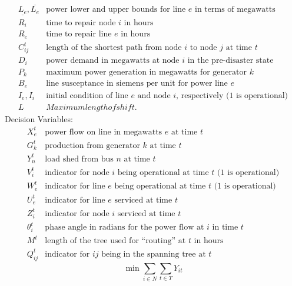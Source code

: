 \documentclass{article}
\begin{document}
	\begin{displaymath}
	\begin{array}{ll}
	\underline{L_e},\overline{L_e} & \mbox{power lower and upper bounds for line $e$ in terms of megawatts}\\
	R_{i} & \mbox{time to repair node $i$ in hours} \\
	R_{e} & \mbox{time to repair line $e$ in hours}\\
	C_{ij}^t & \mbox{length of the shortest path from node $i$ to node $j$ at time $t$}\\
	D_i & \mbox{power demand in megawatts at node $i$ in the pre-disaster state}\\
	P_k & \mbox{maximum power generation in megawatts for generator $k$}\\
	B_e&  \mbox{line susceptance in siemens per unit for power line $e$}\\
	I_e, I_i & \mbox{initial condition of line $e$ and node $i$, respectively (1 is operational)}\\
	L & Maximum length of shift.
		\end{array}
	\end{displaymath}
	Decision Variables:
	\begin{displaymath}
	\begin{array}{ll}
	X_{e}^{t} & \mbox{power flow on line in megawatts $e$ at time $t$}\\
	G_{k}^t & \mbox{production from generator $k$ at time $t$}\\
	Y_{n}^t & \mbox{load shed from bus $n$ at time $t$}\\ 
	V_i^t & \mbox{indicator for node $i$ being operational at time $t$ (1 is operational)}\\
	W_{e}^t & \mbox{indicator for line $e$ being operational at time $t$ (1 is operational)}\\
	U_{e}^t & \mbox{indicator for line $e$ serviced at time $t$}\\
	Z_i^t & \mbox{indicator for node $i$ serviced at time $t$}\\
	\theta_i^t & \mbox{phase angle in radians for the power flow at $i$ in time $t$}\\
	M^t & \mbox{length of the tree used for ``routing'' at $t$ in hours} \\
	Q_{ij}^t & \mbox{indicator for $ij$ being in the spanning tree at $t$}
	\end{array}
	\end{displaymath}
	\begin{equation}
	\min \sum_{i \in N} \sum_{t \in T} Y_{it}
	\end{equation}
\end{document}
